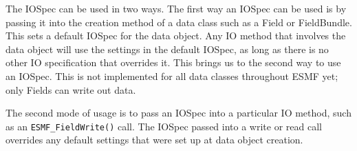 

The IOSpec can be used in two ways.  The first way an IOSpec can 
be used is by passing it into the creation method of a data class 
such as a Field or FieldBundle.  This sets a default IOSpec for the 
data object.  Any IO method that involves the data object will 
use the settings in the default IOSpec, as long as there is no 
other IO specification that overrides it.  This brings us to the 
second way to use an IOSpec.  This is not implemented for all data
classes throughout ESMF yet; only Fields can write out data.

The second mode of usage is to pass an IOSpec into a particular 
IO method, such as an {\tt ESMF\_FieldWrite()} call.  The IOSpec 
passed into a write or read call overrides any default settings 
that were set up at data object creation.
